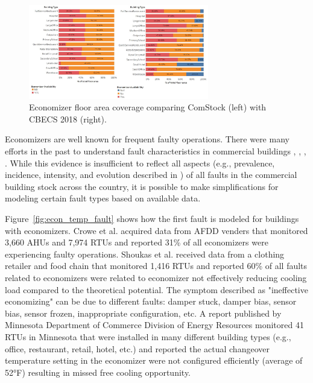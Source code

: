 \begin{figure}
  \centering \includegraphics[width=0.7\textwidth]{figures/economizer_prevalence.png}
  \caption{Economizer floor area coverage comparing ComStock (left) with CBECS 2018 (right).}
  \label{fig:economizer_prevalence}
\end{figure}

Economizers are well known for frequent faulty operations. There were many efforts in the past to understand fault characteristics in commercial buildings \citep{doi_10_1080_23744731_2021_1898243}, \citep{osti_1889192}, \citep{osti_1829706}, \citep{osti_1457127}. While this evidence is insufficient to reflect all aspects (e.g., prevalence, incidence, intensity, and evolution described in \citep{doi_10_1080_23744731_2021_1898243}) of all faults in the commercial building stock across the country, it is possible to make simplifications for modeling certain fault types based on available data.

Figure~\ref{fig:econ_temp_fault} shows how the first fault is modeled for buildings with economizers. Crowe et al. \citep{osti_1889192} acquired data from AFDD venders that monitored 3,660 AHUs and 7,974 RTUs and reported 31\% of all economizers were experiencing faulty operations. Shoukas et al. \citep{osti_1665808} received data from a clothing retailer and food chain that monitored 1,416 RTUs and reported 60\% of all faults related to economizers were related to economizer not effectively reducing cooling load compared to the theoretical potential. The symptom described as "ineffective economizing" can be due to different faults: damper stuck, damper bias, sensor bias, sensor frozen, inappropriate configuration, etc. A report \citep{seventhwave_rtu} published by Minnesota Department of Commerce Division of Energy Resources monitored 41 RTUs in Minnesota that were installed in many different building types (e.g., office, restaurant, retail, hotel, etc.) and reported the actual changeover temperature setting in the economizer were not configured efficiently (average of 52°F) resulting in missed free cooling opportunity.

